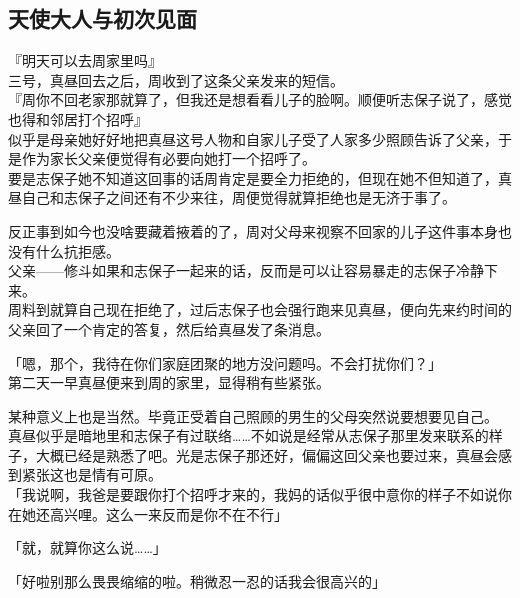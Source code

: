 \subsection{天使大人与初次见面}

『明天可以去周家里吗』\\

三号，真昼回去之后，周收到了这条父亲发来的短信。\\

『周你不回老家那就算了，但我还是想看看儿子的脸啊。顺便听志保子说了，感觉也得和邻居打个招呼』\\

似乎是母亲她好好地把真昼这号人物和自家儿子受了人家多少照顾告诉了父亲，于是作为家长父亲便觉得有必要向她打一个招呼了。\\

要是志保子她不知道这回事的话周肯定是要全力拒绝的，但现在她不但知道了，真昼自己和志保子之间还有不少来往，周便觉得就算拒绝也是无济于事了。

反正事到如今也没啥要藏着掖着的了，周对父母来视察不回家的儿子这件事本身也没有什么抗拒感。\\

父亲——修斗如果和志保子一起来的话，反而是可以让容易暴走的志保子冷静下来。\\

周料到就算自己现在拒绝了，过后志保子也会强行跑来见真昼，便向先来约时间的父亲回了一个肯定的答复，然后给真昼发了条消息。\\

\vspace{2\baselineskip}

「嗯，那个，我待在你们家庭团聚的地方没问题吗。不会打扰你们？」\\

第二天一早真昼便来到周的家里，显得稍有些紧张。

某种意义上也是当然。毕竟正受着自己照顾的男生的父母突然说要想要见自己。\\

真昼似乎是暗地里和志保子有过联络……不如说是经常从志保子那里发来联系的样子，大概已经是熟悉了吧。光是志保子那还好，偏偏这回父亲也要过来，真昼会感到紧张这也是情有可原。\\

「我说啊，我爸是要跟你打个招呼才来的，我妈的话似乎很中意你的样子不如说你在她还高兴哩。这么一来反而是你不在不行」

「就，就算你这么说……」

「好啦别那么畏畏缩缩的啦。稍微忍一忍的话我会很高兴的」\\

